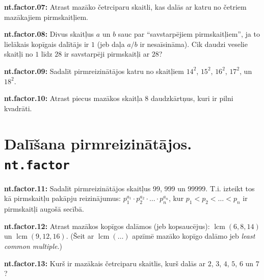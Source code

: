 \documentclass[11pt]{article}
\newenvironment{uzdevums}[1][\unskip]{%
\vspace{3mm}
\noindent
\textbf{#1:}
\noindent}
{}
\begin{document}
\begin{uzdevums}[nt.factor.07]
Atrast mazāko četrciparu skaitli, kas dalās ar katru no četriem mazākajiem pirmskaitļiem. 
\end{uzdevums}

\begin{uzdevums}[nt.factor.08]
Divus skaitļus $a$ un $b$ sauc par ``savstarpējiem pirmskaitļiem'', ja to lielākais kopīgais dalītājs ir $1$ (jeb daļa $a/b$ ir nesaīsināma). Cik daudzi veselie skaitļi no $1$ līdz $28$ ir 
savstarpēji pirmskaitļi ar $28$? 
\end{uzdevums}


\begin{uzdevums}[nt.factor.09]
Sadalīt pirmreizinātājos katru no skaitļiem $14^2$, $15^2$, $16^2$, $17^2$, un $18^2$.
\end{uzdevums}

\begin{uzdevums}[nt.factor.10]
Atrast piecus mazākos skaitļa 8 daudzkārtņus, kuri ir pilni kvadrāti. 
\end{uzdevums}




\section{Dalīšana pirmreizinātājos. \texttt{nt.factor}}

\begin{uzdevums}[nt.factor.11]
Sadalīt pirmreizinātājos skaitļus 99, 999 un 99999. T.i. izteikt tos kā pirmskaitļu pakāpju
reizinājumus: $p_1^{a_1} \cdot p_2^{a_2} \cdot \ldots \cdot p_n^{a_n}$, kur
$p_1 < p_2 < \ldots < p_n$ ir pirmskaitļi augošā secībā.
\end{uzdevums}


\begin{uzdevums}[nt.factor.12]
Atrast mazākos kopīgos dalāmos (jeb kopsaucējus): $\operatorname{lcm}(6,8,14)$ un 
$\operatorname{lcm}(9,12,16)$. (Šeit ar $\operatorname{lcm}(\ldots)$ apzīmē 
mazāko kopīgo dalāmo jeb {\em least common multiple}.)
\end{uzdevums}

\begin{uzdevums}[nt.factor.13]
Kurš ir mazākais četrciparu skaitlis, kurš dalās ar 
$2$, $3$, $4$, $5$, $6$ un $7$?
\end{uzdevums}
\end{document}
